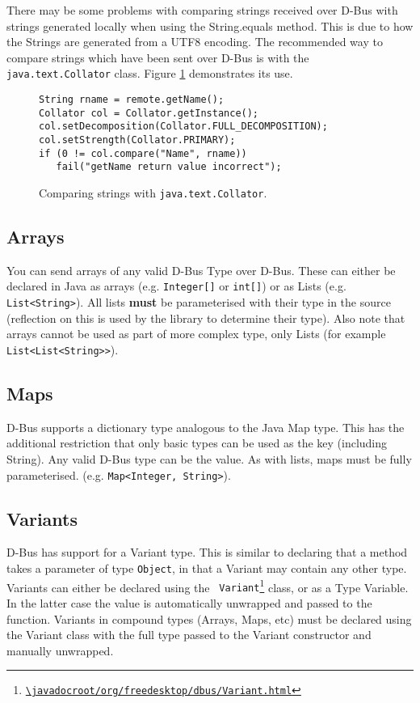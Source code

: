 \documentclass[a4paper,12pt]{article}
\begin{document}
There may be some problems with comparing strings received over D-Bus with
strings generated locally when using the String.equals method. This is due to
how the Strings are generated from a UTF8 encoding. The recommended way to
compare strings which have been sent over D-Bus is with the {\tt
java.text.Collator} class. Figure \ref{fig:collator} demonstrates its use.

\begin{figure}[htb]
\begin{center}
\begin{verbatim}
String rname = remote.getName();
Collator col = Collator.getInstance();
col.setDecomposition(Collator.FULL_DECOMPOSITION);
col.setStrength(Collator.PRIMARY);
if (0 != col.compare("Name", rname))
   fail("getName return value incorrect");
\end{verbatim}
\end{center}
\caption{Comparing strings with {\tt java.text.Collator}.}
\label{fig:collator}
\end{figure}

\subsection{Arrays}

You can send arrays of any valid D-Bus Type over D-Bus. These can either be
declared in Java as arrays (e.g. \verb&Integer[]& or \verb&int[]&) or as Lists
(e.g. \verb&List<String>&). All lists {\bf must} be parameterised with their
type in the source (reflection on this is used by the library to determine
their type). Also note that arrays cannot be used as part of more complex type,
only Lists (for example \verb&List<List<String>>&).

\subsection{Maps}

D-Bus supports a dictionary type analogous to the Java Map type. This
has the additional restriction that only basic types can be used as
the key (including String). Any valid D-Bus type can be the value. As
with lists, maps must be fully parameterised. (e.g.
\verb&Map<Integer, String>&).

\subsection{Variants}

D-Bus has support for a Variant type. This is similar to declaring that a
method takes a parameter of type {\tt Object}, in that a Variant may contain
any other type. Variants can either be declared using the {\tt
Variant\footnote{\url{\javadocroot/org/freedesktop/dbus/Variant.html}}} class, or as
a Type Variable. In the latter case the value is automatically unwrapped and
passed to the function. Variants in compound types (Arrays, Maps, etc) must be
declared using the Variant class with the full type passed to the Variant
constructor and manually unwrapped.
\end{document}
